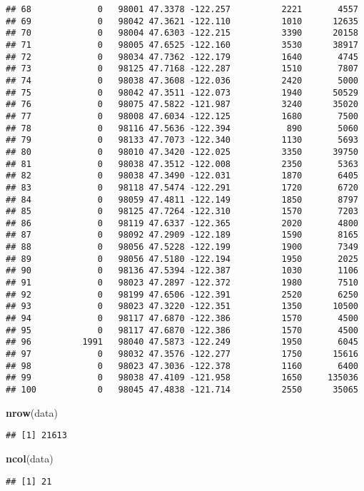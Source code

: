 \documentclass[
]{article}
\newenvironment{Shaded}{\begin{snugshade}}{\end{snugshade}}
\newcommand{\KeywordTok}[1]{\textcolor[rgb]{0.13,0.29,0.53}{\textbf{#1}}}
\newcommand{\NormalTok}[1]{#1}
\begin{document}
\begin{verbatim}
## 68             0   98001 47.3378 -122.257          2221       4557
## 69             0   98042 47.3621 -122.110          1010      12635
## 70             0   98004 47.6303 -122.215          3390      20158
## 71             0   98005 47.6525 -122.160          3530      38917
## 72             0   98034 47.7362 -122.179          1640       4745
## 73             0   98125 47.7168 -122.287          1510       7807
## 74             0   98038 47.3608 -122.036          2420       5000
## 75             0   98042 47.3511 -122.073          1940      50529
## 76             0   98075 47.5822 -121.987          3240      35020
## 77             0   98008 47.6034 -122.125          1680       7500
## 78             0   98116 47.5636 -122.394           890       5060
## 79             0   98133 47.7073 -122.340          1130       5693
## 80             0   98010 47.3420 -122.025          3350      39750
## 81             0   98038 47.3512 -122.008          2350       5363
## 82             0   98038 47.3490 -122.031          1870       6405
## 83             0   98118 47.5474 -122.291          1720       6720
## 84             0   98059 47.4811 -122.149          1850       8797
## 85             0   98125 47.7264 -122.310          1570       7203
## 86             0   98119 47.6337 -122.365          2020       4800
## 87             0   98092 47.2909 -122.189          1590       8165
## 88             0   98056 47.5228 -122.199          1900       7349
## 89             0   98056 47.5180 -122.194          1950       2025
## 90             0   98136 47.5394 -122.387          1030       1106
## 91             0   98023 47.2897 -122.372          1980       7510
## 92             0   98199 47.6506 -122.391          2520       6250
## 93             0   98023 47.3220 -122.351          1350      10500
## 94             0   98117 47.6870 -122.386          1570       4500
## 95             0   98117 47.6870 -122.386          1570       4500
## 96          1991   98040 47.5873 -122.249          1950       6045
## 97             0   98032 47.3576 -122.277          1750      15616
## 98             0   98023 47.3036 -122.378          1160       6400
## 99             0   98038 47.4109 -121.958          1650     135036
## 100            0   98045 47.4838 -121.714          2550      35065
\end{verbatim}

\begin{Shaded}
\begin{Highlighting}[]
\KeywordTok{nrow}\NormalTok{(data)}
\end{Highlighting}
\end{Shaded}

\begin{verbatim}
## [1] 21613
\end{verbatim}

\begin{Shaded}
\begin{Highlighting}[]
\KeywordTok{ncol}\NormalTok{(data)}
\end{Highlighting}
\end{Shaded}

\begin{verbatim}
## [1] 21
\end{verbatim}
\end{document}
